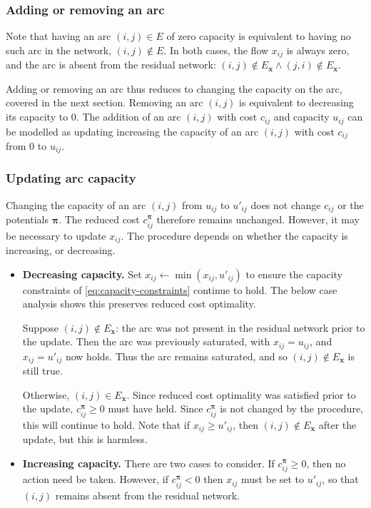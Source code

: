 \subsubsection{Adding or removing an arc}

Note that having an arc $(i,j) \in E$ of zero capacity is equivalent to having no such arc in the network, $(i,j) \not \in E$. In both cases, the flow $x_{ij}$ is always zero, and the arc is absent from the residual network: $(i,j) \not \in E_\mathbf{x} \land (j,i) \not \in E_\mathbf{x}$.

Adding or removing an arc thus reduces to changing the capacity on the arc, covered in the next section. Removing an arc $(i,j)$ is equivalent to decreasing its capacity to $0$. The addition of an arc $(i,j)$ with cost $c_{ij}$ and capacity $u_{ij}$ can be modelled as updating increasing the capacity of an arc $(i,j)$ with cost $c_{ij}$ from $0$ to $u_{ij}$.

\subsubsection{Updating arc capacity}

Changing the capacity of an arc $(i,j)$ from $u_{ij}$ to $u'_{ij}$ does not change $c_{ij}$ or the potentials $\boldsymbol{\pi}$. The reduced cost $c_{ij}^{\boldsymbol{\pi}}$ therefore remains unchanged. However, it may be necessary to update $x_{ij}$. The procedure depends on whether the capacity is increasing, or decreasing.

\begin{itemize}
    \item \textbf{Decreasing capacity.} Set $x_{ij} \gets \min\left(x_{ij},u'_{ij}\right)$ to ensure the capacity constraints of \cref{eq:capacity-constraints} continue to hold\footnotemark. The below case analysis shows this preserves reduced cost optimality.
    
    Suppose $(i,j) \not \in E_\mathbf{x}$: the arc was not present in the residual network prior to the update. Then the arc was previously saturated, with $x_{ij} = u_{ij}$, and $x_{ij} = u'_{ij}$ now holds. Thus the arc remains saturated, and so $(i,j) \not \in E_\mathbf{x}$ is still true.
    
    Otherwise, $(i,j) \in E_\mathbf{x}$. Since reduced cost optimality was satisfied prior to the update, $c_{ij}^{\boldsymbol{\pi}} \geq 0$ must have held. Since $c_{ij}^{\boldsymbol{\pi}}$ is not changed by the procedure, this will continue to hold. Note that if $x_{ij} \geq u'_{ij}$, then $(i,j) \not \in E_\mathbf{x}$ after the update, but this is harmless.
    \item \textbf{Increasing capacity.} There are two cases to consider. If $c_{ij}^{\boldsymbol{\pi}} \geq 0$, then no action need be taken. However, if $c_{ij}^{\boldsymbol{\pi}} < 0$ then $x_{ij}$ must be set to $u'_{ij}$, so that $(i,j)$ remains absent from the residual network.
\end{itemize}

